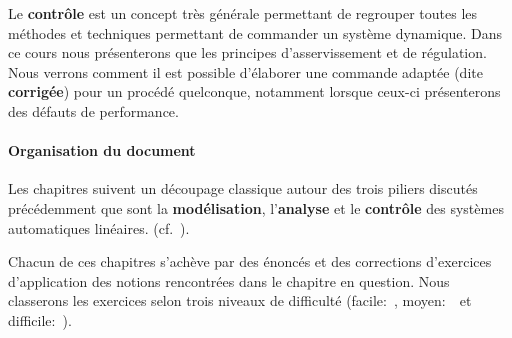 Le \textbf{contrôle} est un concept très générale permettant de regrouper
toutes les méthodes et techniques permettant de commander un système dynamique.
Dans ce cours nous présenterons que les principes d'asservissement et de 
régulation. Nous verrons comment il est possible d'élaborer une commande 
adaptée (dite \textbf{corrigée}) pour un procédé quelconque, notamment 
lorsque ceux-ci présenterons des défauts de performance.
\paragraph{Organisation du document}
Les chapitres suivent un découpage classique autour des trois piliers 
discutés précédemment que sont la \textbf{modélisation}, l'\textbf{analyse} 
et le \textbf{contrôle} des systèmes automatiques linéaires. 
(cf.~).

Chacun de ces chapitres s'achève par des énoncés et des corrections d'exercices 
d'application des notions rencontrées dans le chapitre en question. 
Nous classerons les exercices selon trois niveaux de difficulté 
(facile:~\facile, moyen:~\moyen~et difficile:~\difficile).

